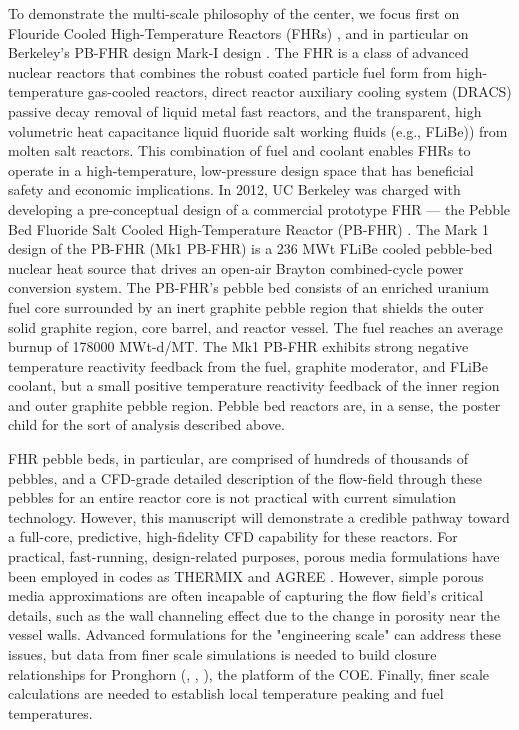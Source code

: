 To demonstrate the multi-scale philosophy of the center, we focus first on Flouride Cooled High-Temperature Reactors (FHRs) \cite{forsberg2015fluoride}, and in particular on Berkeley's PB-FHR design Mark-I design \cite{cisneros2014technical}. The FHR is a class of advanced nuclear reactors that combines the robust coated particle fuel form from high-temperature gas-cooled reactors, direct reactor auxiliary cooling system (DRACS) passive decay removal of liquid metal fast reactors, and the transparent, high volumetric heat capacitance liquid fluoride salt working fluids (e.g., FLiBe)) from molten salt reactors. This combination of fuel and coolant enables FHRs to operate in a high-temperature, low-pressure design space that has beneficial safety and economic implications. In 2012, UC Berkeley was charged with developing a pre-conceptual design of a commercial prototype FHR --- the Pebble Bed Fluoride Salt Cooled High-Temperature Reactor (PB-FHR) \cite{cisneros2014technical}. The Mark 1 design of the PB-FHR (Mk1 PB-FHR) is a 236 MWt FLiBe cooled pebble-bed nuclear heat source that drives an open-air Brayton combined-cycle power conversion system. The PB-FHR's pebble bed consists of an enriched uranium fuel core surrounded by an inert graphite pebble region that shields the outer solid graphite region, core barrel, and reactor vessel. The fuel reaches an average burnup of 178000 MWt-d/MT. The Mk1 PB-FHR exhibits strong negative temperature reactivity feedback from the fuel, graphite moderator, and FLiBe coolant, but a small positive temperature reactivity feedback of the inner region and outer graphite pebble region. Pebble bed reactors are, in a sense, the poster child for the sort of analysis described above.

FHR pebble beds, in particular, are comprised of hundreds of thousands of pebbles, and a CFD-grade detailed description of the flow-field through these pebbles for an entire reactor core is not practical with current simulation technology. However, this manuscript will demonstrate a credible pathway toward a full-core, predictive, high-fidelity CFD capability for these reactors. For practical, fast-running, design-related purposes, porous media formulations have been employed in codes as THERMIX \cite{cleveland1986application} and AGREE \cite{seker2007multiphysics}. However, simple porous media approximations are often incapable of capturing the flow field's critical details, such as the wall channeling effect due to the change in porosity near the vessel walls.  Advanced formulations for the "engineering scale" can address these issues, but data from finer scale simulations is needed to build closure relationships for Pronghorn (\cite{novak2018pronghorn}, \cite{novak1}, \cite{novak2}), the platform of the COE. Finally, finer scale calculations are needed to establish local temperature peaking and fuel temperatures.

